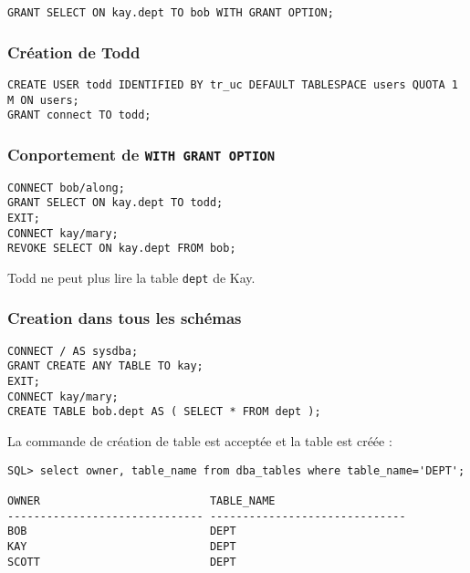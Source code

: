 \begin{verbatim}
GRANT SELECT ON kay.dept TO bob WITH GRANT OPTION;
\end{verbatim}

\subsubsection{Création de Todd}

\begin{verbatim}
CREATE USER todd IDENTIFIED BY tr_uc DEFAULT TABLESPACE users QUOTA 1 M ON users;
GRANT connect TO todd;
\end{verbatim}

\subsubsection{Conportement de \texttt{WITH GRANT OPTION}}

\begin{verbatim}
CONNECT bob/along;
GRANT SELECT ON kay.dept TO todd;
EXIT;
CONNECT kay/mary;
REVOKE SELECT ON kay.dept FROM bob;
\end{verbatim}

Todd ne peut plus lire la table \texttt{dept} de Kay.

\subsubsection{Creation dans tous les schémas}

\begin{verbatim}
CONNECT / AS sysdba;
GRANT CREATE ANY TABLE TO kay;
EXIT;
CONNECT kay/mary;
CREATE TABLE bob.dept AS ( SELECT * FROM dept );
\end{verbatim}

La commande de création de table est acceptée et la table est créée :
\begin{verbatim}
SQL> select owner, table_name from dba_tables where table_name='DEPT';

OWNER                          TABLE_NAME                                       
------------------------------ ------------------------------                   
BOB                            DEPT                                             
KAY                            DEPT                                             
SCOTT                          DEPT                                             
\end{verbatim}
